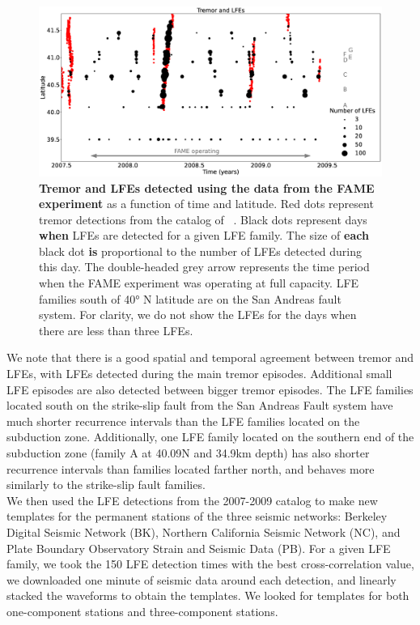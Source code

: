 \documentclass[draft]{agujournal2019}
\begin{document}
\begin{figure}
\noindent\includegraphics[width=\textwidth, trim={0cm 0cm 0cm 0cm},clip]{figures/tremor_nb_FAME_3.eps}
\caption{\textbf{Tremor and LFEs detected using the data from the FAME experiment} as a function of time and latitude. Red dots represent tremor detections from the catalog of ~. Black dots represent days \textbf{when} LFEs are detected for a given LFE family. The size of \textbf{each} black dot \textbf{is} proportional to the number of LFEs detected during this day. The double-headed grey arrow represents the time period when the FAME experiment was operating at full capacity. LFE families south of 40° N latitude are on the San Andreas fault system. For clarity, we do not show the LFEs for the days when there are less than three LFEs.}
\label{pngfiguresample}
\end{figure}

We note that there is a good spatial and temporal agreement between tremor and LFEs, with LFEs detected during the main tremor episodes. Additional small LFE episodes are also detected between bigger tremor episodes. The LFE families located south on the strike-slip fault from the San Andreas Fault system have much shorter recurrence intervals than the LFE families located on the subduction zone. Additionally, one LFE family located on the southern end of the subduction zone (family A at 40.09N and 34.9km depth) has also shorter recurrence intervals than families located farther north, and behaves more similarly to the strike-slip fault families. \\

We then used the LFE detections from the 2007-2009 catalog to make new templates for the permanent stations of the three seismic networks: Berkeley Digital Seismic Network (BK), Northern California Seismic Network (NC), and Plate Boundary Observatory Strain and Seismic Data (PB). For a given LFE family, we took the 150 LFE detection times with the best cross-correlation value, we downloaded one minute of seismic data around each detection, and linearly stacked the waveforms to obtain the templates. We looked for templates for both one-component stations and three-component stations. \\
\end{document}
